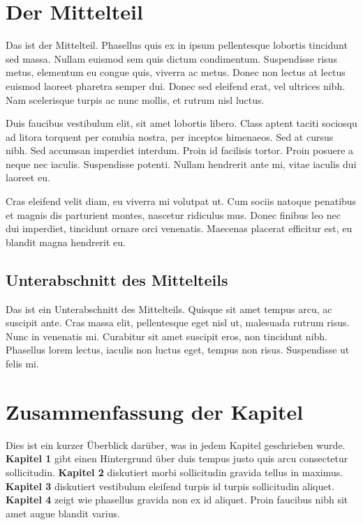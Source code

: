 \documentclass[listof=totoc,index=totoc,bibliography=totoc,12pt,ngerman,a4paper,]{report}
\begin{document}
\section{Der Mittelteil}\label{der-mittelteil}

Das ist der Mittelteil. Phasellus quis ex in ipsum pellentesque lobortis
tincidunt sed massa. Nullam euismod sem quis dictum condimentum.
Suspendisse risus metus, elementum eu congue quis, viverra ac metus.
Donec non lectus at lectus euismod laoreet pharetra semper dui. Donec
sed eleifend erat, vel ultrices nibh. Nam scelerisque turpis ac nunc
mollis, et rutrum nisl luctus.

Duis faucibus vestibulum elit, sit amet lobortis libero. Class aptent
taciti sociosqu ad litora torquent per conubia nostra, per inceptos
himenaeos. Sed at cursus nibh. Sed accumsan imperdiet interdum. Proin id
facilisis tortor. Proin posuere a neque nec iaculis. Suspendisse
potenti. Nullam hendrerit ante mi, vitae iaculis dui laoreet eu.

Cras eleifend velit diam, eu viverra mi volutpat ut. Cum sociis natoque
penatibus et magnis dis parturient montes, nascetur ridiculus mus. Donec
finibus leo nec dui imperdiet, tincidunt ornare orci venenatis. Maecenas
placerat efficitur est, eu blandit magna hendrerit eu.

\subsection{Unterabschnitt des
Mittelteils}\label{unterabschnitt-des-mittelteils}

Das ist ein Unterabschnitt des Mittelteils. Quisque sit amet tempus
arcu, ac suscipit ante. Cras massa elit, pellentesque eget nisl ut,
malesuada rutrum risus. Nunc in venenatis mi. Curabitur sit amet
suscipit eros, non tincidunt nibh. Phasellus lorem lectus, iaculis non
luctus eget, tempus non risus. Suspendisse ut felis mi.

\section{Zusammenfassung der Kapitel}\label{zusammenfassung-der-kapitel}

Dies ist ein kurzer Überblick darüber, was in jedem Kapitel geschrieben
wurde. \textbf{Kapitel 1} gibt einen Hintergrund über duis tempus justo
quis arcu consectetur sollicitudin. \textbf{Kapitel 2} diskutiert morbi
sollicitudin gravida tellus in maximus. \textbf{Kapitel 3} diskutiert
vestibulum eleifend turpis id turpis sollicitudin aliquet.
\textbf{Kapitel 4} zeigt wie phasellus gravida non ex id aliquet. Proin
faucibus nibh sit amet augue blandit varius.
\end{document}
